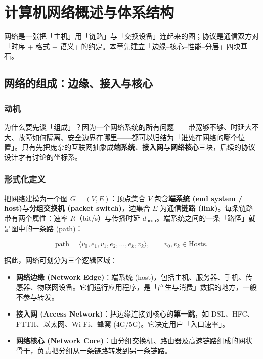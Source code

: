 \clearpage
\begingroup
\let\clearpage\relax
\let\cleardoublepage\relax
\vspace*{\fill}
\chapter{计算机网络概述与体系结构}
\begin{center}
网络是一张把「主机」用「链路」与「交换设备」连起来的图；协议是通信双方对「时序 + 格式 + 语义」的约定。本章先建立「边缘--核心--性能--分层」四块基石。
\end{center}
\vspace*{\fill}
\endgroup
\clearpage

\section{网络的组成：边缘、接入与核心}

\subsection{动机}
为什么要先谈「组成」？因为一个网络系统的所有问题——带宽够不够、时延大不大、故障如何隔离、安全边界在哪里——都可以归结为「谁处在网络的哪个位置」。只有先把庞杂的互联网抽象成\textbf{端系统}、\textbf{接入网}与\textbf{网络核心}三块，后续的协议设计才有讨论的坐标系。

\subsection{形式化定义}
把网络建模为一个图 $G=(V,E)$：顶点集合 $V$ 包含\textbf{端系统 (end system / host)}与\textbf{分组交换机 (packet switch)}，边集合 $E$ 为通信\textbf{链路 (link)}。每条链路带有两个属性：速率 $R$（bit/s）与传播时延 $d_{\text{prop}}$。端系统之间的一条「路径」就是图中的一条路 (path)：

\begin{equation}
    \text{path} = \langle v_0, e_1, v_1, e_2, \dots, e_k, v_k \rangle, \qquad v_0, v_k \in \text{Hosts}.
\end{equation}

据此，网络可划分为三个逻辑区域：

\begin{itemize}
    \item \textbf{网络边缘 (Network Edge)}：端系统 (host)，包括主机、服务器、手机、传感器、物联网设备。它们运行应用程序，是「产生与消费」数据的地方，一般不参与转发。
    \item \textbf{接入网 (Access Network)}：把边缘连接到核心的\textbf{第一跳}，如 DSL、HFC、FTTH、以太网、Wi-Fi、蜂窝 (4G/5G)。它决定用户「入口速率」。
    \item \textbf{网络核心 (Network Core)}：由分组交换机、路由器及高速链路组成的网状骨干，负责把分组从一条链路转发到另一条链路。
\end{itemize}

